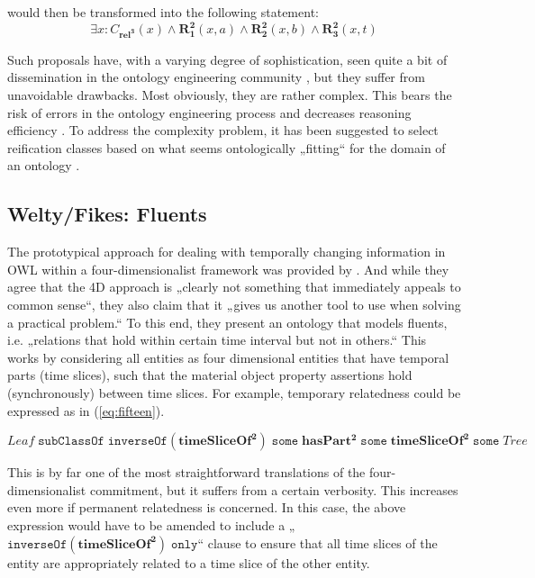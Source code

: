\documentclass[10pt]{bmc_article}
\newcommand{\mirel}[1]{\ensuremath{\mathrm{\mathbf{#1}}}}
\newcommand{\mclass}[1]{\ensuremath{\mathit{#1}}}
\newcommand{\mrel}[2]{\mirel{#1^#2}}
\newcommand{\mrelb}[1]{\mrel{#1}{2}}
\newcommand{\mrelt}[1]{\mrel{#1}{3}}
\newenvironment{bmcformat}{\baselineskip20pt\sloppy\setboolean{publ}{false}}{\baselineskip20pt\sloppy}
\begin{document}
\begin{bmcformat}
would then be transformed into the following statement:
\begin{equation}
\exists x: \mclass{C_\mrelt{rel}}(x) \wedge
\mrelb{R_1}(x,a) \wedge
\mrelb{R_2}(x,b) \wedge
\mrelb{R_3}(x,t) 
\end{equation}

Such proposals have, with a varying degree of sophistication, seen quite a bit
of dissemination in the ontology engineering community \cite{ODP:nary}, but they suffer
from unavoidable drawbacks. Most obviously, they are rather complex. This bears
the risk of errors in the ontology engineering process and decreases reasoning
efficiency \cite{Grewe:2010}. To address the complexity problem, it has been suggested to
select reification classes based on what seems ontologically „fitting“ for the
domain of an ontology \cite{Fiadeiro:2010}.

\subsection*{Welty/Fikes: Fluents}
The prototypical approach for dealing with temporally changing information in
OWL within a four-dimensionalist framework was provided by 
\cite{Welty:2006}. And while they agree that the 4D  approach is „clearly 
not something that immediately appeals to common sense“, they also claim
that it „gives us another tool to use when solving a practical problem.“ To this
end, they present an ontology that models fluents, i.e. „relations that hold
within certain time interval but not in others.“ This works by considering all
entities as four dimensional entities that have temporal parts (time slices),
such that the material object property assertions hold (synchronously) between
time slices. For example, temporary relatedness could be expressed as in
(\ref{eq:fifteen}).

\begin{equation}
\mclass{Leaf}\;\mathtt{subClassOf}\;\mathtt{inverseOf}(\mrelb{timeSliceOf})\;\mathtt{some}\;
            \mrelb{hasPart}\;\mathtt{some}\;\mrelb{timeSliceOf}\;\mathtt{some}\;\mclass{Tree}
\label{eq:fifteen}
\end{equation}

This is by far one of the most straightforward translations of the
four-dimensionalist commitment, but it suffers from a certain verbosity. This
increases even more if permanent relatedness is concerned. In this case, the
above expression would have to be amended to include a
„$\mathtt{inverseOf}(\mrelb{timeSliceOf})\;\mathtt{only}$“ clause to ensure that
all time slices of the entity are appropriately related to a time slice of the
other entity.


\end{bmcformat}
\end{document}

